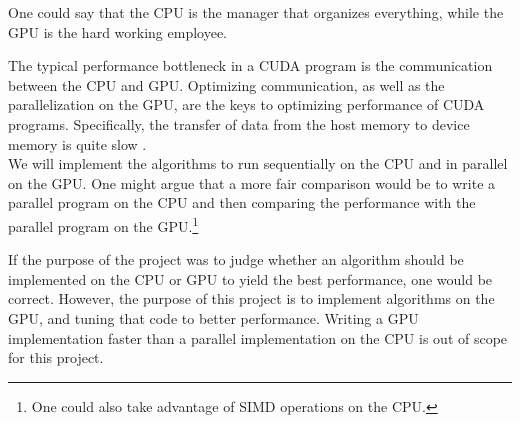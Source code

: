 One could say that the CPU is the manager that organizes everything, while the GPU is the hard working employee.

The typical performance bottleneck in a CUDA program is the communication between the CPU and GPU. Optimizing communication, as well as the parallelization on the GPU, are the keys to optimizing performance of CUDA programs. Specifically, the transfer of data from the host memory to device memory is quite slow \cite[Sect. 5.3.1]{nvidia:cudadoc}.\\


\noindent We will implement the algorithms to run sequentially on the CPU and in parallel on the GPU. One might argue that a more fair comparison would be to write a parallel program on the CPU and then comparing the performance with the parallel program on the GPU.\footnote{One could also take advantage of SIMD operations on the CPU.}

If the purpose of the project was to judge whether an algorithm should be implemented on the CPU or GPU to yield the best performance, one would be correct. However, the purpose of this project is to implement algorithms on the GPU, and tuning that code to better performance. Writing a GPU implementation faster than a parallel implementation on the CPU is out of scope for this project.

